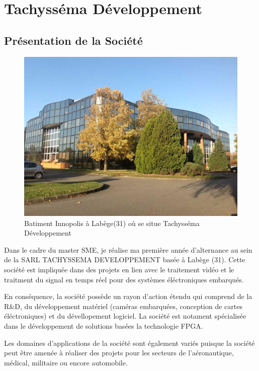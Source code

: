 \section{Tachysséma Développement}
\subsection{Présentation de la Société}

\begin{figure}[ht]
    \centering
    \includegraphics[scale=0.3]{img/bureau.jpg}
    \caption{Batiment Innopolis à Labège(31) où se situe Tachysséma Développement }
    \label{fig:CameraCmdsettings}
\end{figure}



Dans le cadre du master SME, je réalise ma première année d'alternance au sein de la SARL TACHYSSEMA DEVELOPPEMENT basée à Labège (31).
Cette société est impliquée dans des projets en lien avec le traitement vidéo et le traitment du signal en temps réel pour des systèmes éléctroniques embarqués. 

En conséquence, la société possède un rayon d'action étendu qui comprend de la R\&D, du développement matériel (caméras embarquées, conception de cartes éléctroniques) et du dévellopement logiciel. La société est notament spécialisée dans le développement de solutions basées la technologie FPGA.  

Les domaines d'applications de la société sont également variés puisque la société peut être amenée à réaliser des projets pour les secteurs de l'aéronautique, médical, militaire ou encore automobile. 



